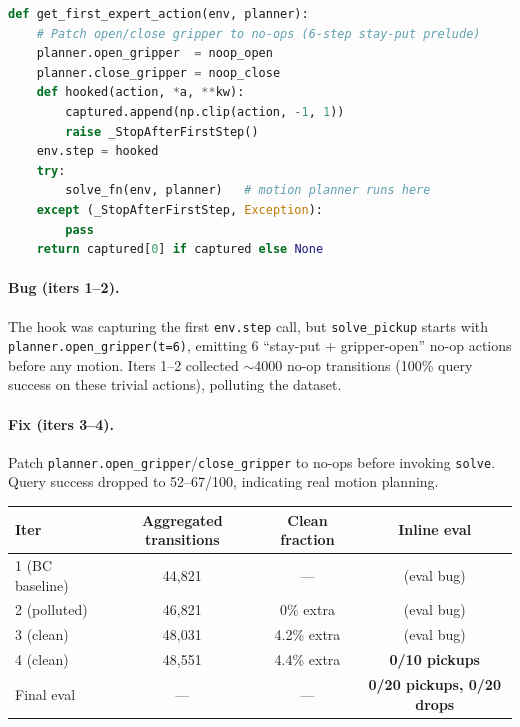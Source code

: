 \documentclass[11pt,letterpaper]{article}
\begin{document}
\begin{codeblock}
\begin{lstlisting}[language=python]
def get_first_expert_action(env, planner):
    # Patch open/close gripper to no-ops (6-step stay-put prelude)
    planner.open_gripper  = noop_open
    planner.close_gripper = noop_close
    def hooked(action, *a, **kw):
        captured.append(np.clip(action, -1, 1))
        raise _StopAfterFirstStep()
    env.step = hooked
    try:
        solve_fn(env, planner)   # motion planner runs here
    except (_StopAfterFirstStep, Exception):
        pass
    return captured[0] if captured else None
\end{lstlisting}
\end{codeblock}

\paragraph{Bug (iters 1–2).}
The hook was capturing the first \texttt{env.step} call, but
\texttt{solve\_pickup} starts with \texttt{planner.open\_gripper(t=6)}, emitting
6 ``stay-put + gripper-open'' no-op actions before any motion. Iters 1–2
collected $\sim$4000 no-op transitions (100\% query success on these trivial
actions), polluting the dataset.

\paragraph{Fix (iters 3–4).}
Patch \texttt{planner.open\_gripper}/\texttt{close\_gripper} to no-ops before
invoking \texttt{solve}. Query success dropped to 52–67/100, indicating real
motion planning.

\begin{table}[H]
\centering
\begin{tabular}{lccc}
\toprule
\textbf{Iter} & \textbf{Aggregated transitions} & \textbf{Clean fraction} & \textbf{Inline eval} \\
\midrule
1 (BC baseline) & 44,821 & — & (eval bug) \\
2 (polluted) & 46,821 & 0\% extra & (eval bug) \\
3 (clean) & 48,031 & 4.2\% extra & (eval bug) \\
4 (clean) & 48,551 & 4.4\% extra & \textbf{0/10 pickups} \\
Final eval & — & — & \textbf{0/20 pickups, 0/20 drops} \\
\bottomrule
\end{tabular}
\end{table}
\end{document}
